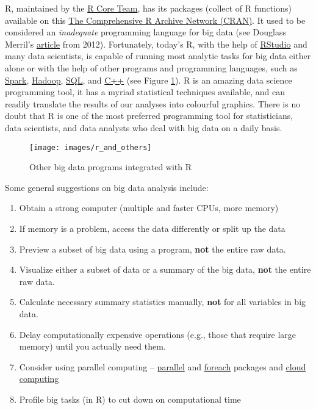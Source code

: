 \documentclass[
]{book}
\begin{document}
R, maintained by the \href{https://www.r-project.org/contributors.html}{R Core Team}, has its packages (collect of R functions) available on this \href{https://cran.r-project.org/}{The Comprehensive R Archive Network (CRAN)}. It used to be considered an \emph{inadequate} programming language for big data (see Douglass Merril's \href{https://www.forbes.com/sites/douglasmerrill/2012/05/01/r-is-not-enough-for-big-data/\#59c7ad9b5924}{article} from 2012). Fortunately, today's R, with the help of \href{https://www.rstudio.com/}{RStudio} and many data scientists, is capable of running most analytic tasks for big data either alone or with the help of other programs and programming languages, such as \href{https://spark.apache.org/docs/latest/sparkr.html}{Spark}, \href{https://hadoop.apache.org/}{Hadoop}, \href{https://en.wikipedia.org/wiki/SQL}{SQL}, and \href{http://www.cplusplus.com/}{C++} (see Figure \ref{fig:fig1-2}). R is an amazing data science programming tool, it has a myriad statistical techniques available, and can readily translate the results of our analyses into colourful graphics. There is no doubt that R is one of the most preferred programming tool for statisticians, data scientists, and data analysts who deal with big data on a daily basis.

\begin{figure}
\texttt{[image: images/r\_and\_others]} \caption{Other big data programs integrated with R}\label{fig:fig1-2}
\end{figure}

Some general suggestions on big data analysis include:

\begin{enumerate}
\def\labelenumi{\arabic{enumi}.}
\item
  Obtain a strong computer (multiple and faster CPUs, more memory)
\item
  If memory is a problem, access the data differently or split up the data
\item
  Preview a subset of big data using a program, \textbf{not} the entire raw data.
\item
  Visualize either a subset of data or a summary of the big data, \textbf{not} the entire raw data.
\item
  Calculate necessary summary statistics manually, \textbf{not} for all variables in big data.
\item
  Delay computationally expensive operations (e.g., those that require large memory) until you actually need them.
\item
  Consider using parallel computing -- \href{https://stat.ethz.ch/R-manual/R-devel/library/parallel/doc/parallel.pdf}{parallel} and \href{https://cran.r-project.org/web/packages/foreach/vignettes/foreach.pdf}{foreach} packages and \href{https://rstudio.cloud/}{cloud computing}
\item
  Profile big tasks (in R) to cut down on computational time
\end{enumerate}
\end{document}
